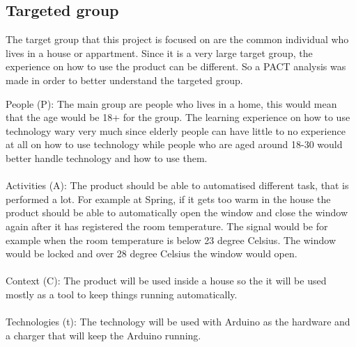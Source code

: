 \subsection{Targeted group}
\label{targetedGroup}
The target group that this project is focused on are the common individual who lives in a house or appartment. Since it is a very large target group, the experience on how to use the product can be different. So a PACT analysis was made in order to better understand the targeted group.

People (P): The main group are people who lives in a home, this would mean that the age would be 18+ for the group. The learning experience on how to use technology wary very much since elderly people can have little to no experience at all on how to use technology while people who are aged around 18-30 would better handle technology and how to use them. \\
\\
Activities (A): The product should be able to automatised different task, that is performed a lot. For example at Spring, if it gets too warm in the house the product should be able to automatically open the window and close the window again after it has registered the room temperature. The signal would be for example when the room temperature is below 23 degree Celsius. The window would be locked and over 28 degree Celsius the window would open. \\
\\

Context (C): The product will be used inside a house so the it will be used mostly as a tool to keep things running automatically.\\
\\

Technologies (t): The technology will be used with Arduino as the hardware and a charger that will keep the Arduino running. %
\\